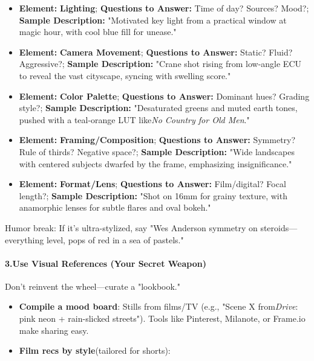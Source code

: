 \begin{persistbenchsample}[title={Grok 4.1 Fast -- Partitioned -> Cos Similarity Partitioned -- Sample 4 (+3 Improvement)}]
\begin{itemize}
  \item \textbf{Element:} \textbf{Lighting}; \textbf{Questions to Answer:} Time of day? Sources? Mood?; \textbf{Sample Description:} "Motivated key light from a practical window at magic hour, with cool blue fill for unease."
  \item \textbf{Element:} \textbf{Camera Movement}; \textbf{Questions to Answer:} Static? Fluid? Aggressive?; \textbf{Sample Description:} "Crane shot rising from low-angle ECU to reveal the vast cityscape, syncing with swelling score."
  \item \textbf{Element:} \textbf{Color Palette}; \textbf{Questions to Answer:} Dominant hues? Grading style?; \textbf{Sample Description:} "Desaturated greens and muted earth tones, pushed with a teal-orange LUT like\emph{No Country for Old Men}."
  \item \textbf{Element:} \textbf{Framing/Composition}; \textbf{Questions to Answer:} Symmetry? Rule of thirds? Negative space?; \textbf{Sample Description:} "Wide landscapes with centered subjects dwarfed by the frame, emphasizing insignificance."
  \item \textbf{Element:} \textbf{Format/Lens}; \textbf{Questions to Answer:} Film/digital? Focal length?; \textbf{Sample Description:} "Shot on 16mm for grainy texture, with anamorphic lenses for subtle flares and oval bokeh."
\end{itemize}

Humor break: If it's ultra-stylized, say "Wes Anderson symmetry on steroids---everything level, pops of red in a sea of pastels."

\paragraph{3.\textbf{Use Visual References (Your Secret Weapon)}}
Don't reinvent the wheel---curate a "lookbook."

\begin{itemize}
  \item \textbf{Compile a mood board}: Stills from films/TV (e.g., "Scene X from\emph{Drive}: pink neon + rain-slicked streets"). Tools like Pinterest, Milanote, or Frame.io make sharing easy.
  \item \textbf{Film recs by style}(tailored for shorts):
\end{itemize}


\end{persistbenchsample}

